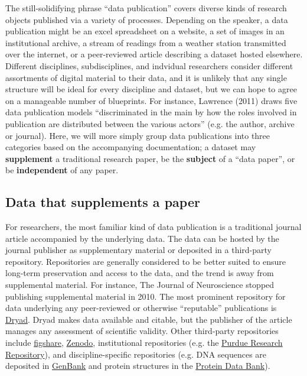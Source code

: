 \documentclass[10pt,twocolumn]{article}
\begin{document}
The still-solidifying phrase ``data publication'' covers diverse kinds of research objects published via a variety of processes.
Depending on the speaker, a data publication might be an excel spreadsheet on a website, a set of images in an institutional archive, a stream of readings from a weather station transmitted over the internet, or a peer-reviewed article describing a dataset hosted elsewhere.
Different disciplines, subdisciplines, and indvidual researchers consider different assortments of digital material to their data, and it is unlikely that any single structure will be ideal for every discipline and dataset, but we can hope to agree on a manageable number of blueprints.
For instance, Lawrence (2011) draws five data publication models ``discriminated in the main by how the roles involved in publication are distributed between the various actors'' (e.g. the author, archive or journal).\cite{lawrence_data_2011}
Here, we will more simply group data publications into three categories based on the accompanying documentation; a dataset may \textbf{supplement} a traditional research paper, be the \textbf{subject} of a ``data paper'', or be \textbf{independent} of any paper.

\subsection*{Data that supplements a paper}\label{paper-supplement-data}

For researchers, the most familiar kind of data publication is a traditional journal article accompanied by the underlying data.
The data can be hosted by the journal publisher as supplementary material or deposited in a third-party repository.
Repositories are generally considered to be better suited to ensure long-term preservation and access to the data, and the trend is away from supplemental material. 
For instance, The Journal of Neuroscience stopped publishing supplemental material in 2010.\cite{maunsell_announcement_2010}
The most prominent repository for data underlying any peer-reviewed or otherwise ``reputable'' publications is \href{http://www.datadryad.org/}{Dryad}. 
Dryad makes data available and citable, but the publisher of the article manages any assessment of scientific validity.
Other third-party repositories include \href{http://figshare.com/}{figshare}, \href{http://zenodo.org/}{Zenodo}, institutional repositories (e.g. the \href{https://purr.purdue.edu/}{Purdue Research Repository}), and discipline-specific repositories (e.g. DNA sequences are deposited in \href{http://www.ncbi.nlm.nih.gov/genbank/}{GenBank}\cite{benson_genbank_2013} and protein structures in the \href{http://www.rcsb.org/}{Protein Data Bank}\cite{berman_protein_2000}).
\end{document}

